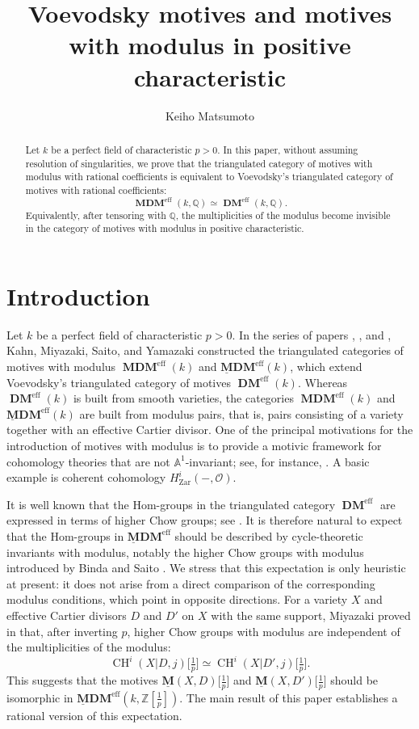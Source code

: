 \documentclass[11pt]{amsart}
\renewcommand{\AA}{\mathbb{A}}
\newcommand{\Q}{\mathbb{Q}}
\newcommand{\Z}{\mathbb{Z}}
\newcommand{\sO}{\mathcal{O}}
\newcommand{\DM}{\operatorname{\mathbf{DM}}}
\newcommand{\MDM}{\operatorname{\mathbf{MDM}}}
\newcommand{\ulMDM}{\operatorname{\mathbf{\underline{M}DM}}}
\newcommand{\eff}{{\operatorname{eff}}}
\newcommand{\Zar}{{\operatorname{Zar}}}
\newcommand{\CH}{{\operatorname{CH}}}
\newcommand{\M}{\mathbf{M}}
\newcommand{\ulM}{\underline{\M}}
\theoremstyle{definition}
\theoremstyle{remark}
\numberwithin{equation}{section}
\begin{document}
\title[Voevodsky motives and motives with modulus]{Voevodsky motives and motives with modulus in positive characteristic}
\author{Keiho Matsumoto}

\begin{abstract}
Let $k$ be a perfect field of characteristic $p>0$. In this paper, without assuming resolution of singularities, we prove that the triangulated category of motives with modulus with rational coefficients is equivalent to Voevodsky's triangulated category of motives with rational coefficients:
\[
\MDM^\eff(k,\Q)\simeq \DM^\eff(k,\Q).
\]
Equivalently, after tensoring with $\Q$, the multiplicities of the modulus become invisible in the category of motives with modulus in positive characteristic.
\end{abstract}

\maketitle

\section{Introduction}

Let $k$ be a perfect field of characteristic $p>0$. In the series of papers \cite{KMSY19a}, \cite{KMSY19b}, and \cite{KMSY22a}, Kahn, Miyazaki, Saito, and Yamazaki constructed the triangulated categories of motives with modulus $\MDM^\eff(k)$ and $\ulMDM^\eff(k)$, which extend Voevodsky's triangulated category of motives $\DM^\eff(k)$. Whereas $\DM^\eff(k)$ is built from smooth varieties, the categories $\MDM^\eff(k)$ and $\ulMDM^\eff(k)$ are built from modulus pairs, that is, pairs consisting of a variety together with an effective Cartier divisor. One of the principal motivations for the introduction of motives with modulus is to provide a motivic framework for cohomology theories that are not $\AA^1$-invariant; see, for instance, \cite{KSY15}. A basic example is coherent cohomology $H^i_{\Zar}(-,\sO)$.

It is well known that the Hom-groups in the triangulated category $\DM^\eff$ are expressed in terms of higher Chow groups; see \cite[Corollary 4.2.6]{V02}. It is therefore natural to expect that the Hom-groups in $\ulMDM^\eff$ should be described by cycle-theoretic invariants with modulus, notably the higher Chow groups with modulus introduced by Binda and Saito \cite{BS18}. We stress that this expectation is only heuristic at present: it does not arise from a direct comparison of the corresponding modulus conditions, which point in opposite directions. For a variety $X$ and effective Cartier divisors $D$ and $D'$ on $X$ with the same support, Miyazaki proved in \cite{M19a} that, after inverting $p$, higher Chow groups with modulus are independent of the multiplicities of the modulus:
\[
\CH^i(X|D,j)\bigl[\tfrac{1}{p}\bigr] \simeq \CH^i(X|D',j)\bigl[\tfrac{1}{p}\bigr].
\]
This suggests that the motives $\ulM(X,D)\bigl[\tfrac{1}{p}\bigr]$ and $\ulM(X,D')\bigl[\tfrac{1}{p}\bigr]$ should be isomorphic in $\ulMDM^\eff(k,\Z[\tfrac{1}{p}])$. The main result of this paper establishes a rational version of this expectation.
\end{document}
